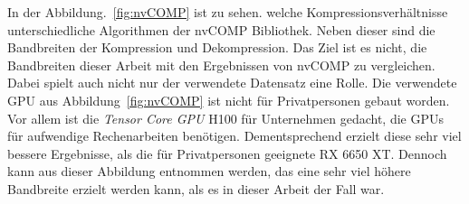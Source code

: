 In der Abbildung.~\ref{fig:nvCOMP} ist zu sehen. welche Kompressionsverhältnisse unterschiedliche Algorithmen der nvCOMP Bibliothek.
Neben dieser sind die Bandbreiten der Kompression und Dekompression.
Das Ziel ist es nicht, die Bandbreiten dieser Arbeit mit den Ergebnissen von nvCOMP zu vergleichen.
Dabei spielt auch nicht nur der verwendete Datensatz eine Rolle.
Die verwendete GPU aus Abbildung~\ref{fig:nvCOMP} ist nicht für Privatpersonen gebaut worden.
Vor allem ist die \textit{Tensor Core GPU} H100 für Unternehmen gedacht, die GPUs für aufwendige Rechenarbeiten benötigen.
Dementsprechend erzielt diese sehr viel bessere Ergebnisse, als die für Privatpersonen geeignete RX 6650 XT.
Dennoch kann aus dieser Abbildung entnommen werden, das eine sehr viel höhere Bandbreite erzielt werden kann, als es in dieser Arbeit der Fall war.

